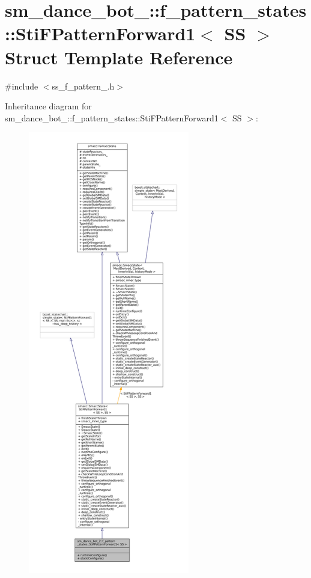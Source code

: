 \hypertarget{classsm__dance__bot__2_1_1f__pattern__states_1_1StiFPatternForward1}{}\section{sm\+\_\+dance\+\_\+bot\+\_\+:\+:f\+\_\+pattern\+\_\+states\+:\+:Sti\+F\+Pattern\+Forward1$<$ SS $>$ Struct Template Reference}
\label{classsm__dance__bot__2_1_1f__pattern__states_1_1StiFPatternForward1}


{\ttfamily \#include $<$ss\+\_\+f\+\_\+pattern\+\_.\+h$>$}



Inheritance diagram for sm\+\_\+dance\+\_\+bot\+\_\+:\+:f\+\_\+pattern\+\_\+states\+:\+:Sti\+F\+Pattern\+Forward1$<$ SS $>$\+:
\nopagebreak
\begin{figure}[H]
\begin{center}
\leavevmode
\includegraphics[height=550pt]{classsm__dance__bot__2_1_1f__pattern__states_1_1StiFPatternForward1__inherit__graph}
\end{center}
\end{figure}


